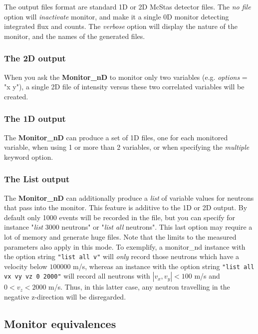 The output files format are standard 1D or 2D McStas detector files.
The \textit{no file} option will \textit{inactivate} monitor, and make it a
single 0D monitor detecting integrated flux and counts.
The \textit{verbose} option will display the nature of the monitor, and the
names of the generated files.

\subsubsection{The 2D output}

When you ask the \textbf{Monitor\_nD} to monitor only two variables (e.g.
\textit{options} = "x y"), a single 2D file of intensity versus these two
correlated variables will be created.

\subsubsection{The 1D output}

The \textbf{Monitor\_nD} can produce a set of 1D files, one for each
monitored variable, when using 1 or more than 2 variables, or when
specifying the \textit{multiple} keyword option.

\subsubsection{The List output}

The \textbf{Monitor\_nD} can additionally produce a \textit{list} of variable
values for neutrons that pass into the monitor. This feature is additive
to the 1D or 2D output. By default only 1000 events will be recorded in
the file, but you can specify for instance "\textit{list} 3000 neutrons" or
"\textit{list all} neutrons". This last option may require a lot of
memory and generate huge files. Note that the limits to the measured parameters also apply in this mode.
To exemplify, a monitor\_nd instance with the option string \verb+"list all v"+ will \emph{only} record those neutrons which have a velocity below $100000$ m/s,
whereas an instance with the option string \verb+"list all vx vy vz 0 2000"+ will record all neutrons with $|v_x,v_y|<100$ m/s and $0<v_z<2000$ m/s. 
Thus, in this latter case, any neutron travelling in the negative z-direction will be disregarded.

\subsection{Monitor equivalences}

